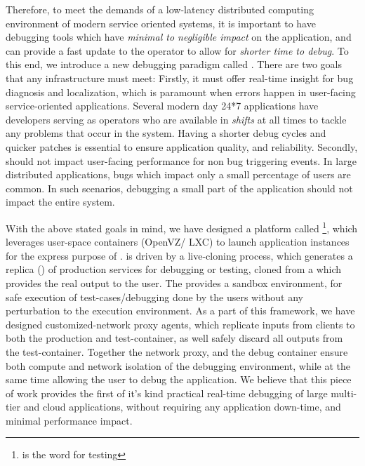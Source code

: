 Therefore, to meet the demands of a low-latency distributed computing environment of modern service oriented systems, it is important to have debugging tools which have \textit{minimal to negligible impact} on the application, and can provide a fast update to the operator to allow for \textit{shorter time to debug}.
To this end, we introduce a new debugging paradigm called \livedebugging.
There are two goals that any \livedebugging infrastructure must meet:
Firstly, it must offer real-time insight for bug diagnosis and localization, which is paramount when errors happen in user-facing service-oriented applications. 
Several modern day 24*7 applications have developers serving as operators who are available in \textit{shifts} at all times to tackle any problems that occur in the system.
Having a shorter debug cycles and quicker patches is essential to ensure application quality, and reliability.
Secondly, \livedebugging should not impact user-facing performance for non bug triggering events.
In large distributed applications, bugs which impact only a small percentage of users are common. 
In such scenarios, debugging a small part of the application should not impact the entire system.

With the above stated goals in mind, we have designed a platform called \parikshan\footnote{\parikshan is the \toolNameLang word for  testing}, which leverages user-space containers (OpenVZ/ LXC) to launch application instances for the express purpose of \livedebugging. 
\parikshan is driven by a  live-cloning process, which generates a replica (\debugcontainer) of production services for debugging or testing, cloned from a \productioncontainer which provides the real output to the user.
The \debugcontainer provides a sandbox environment, for safe execution of test-cases/debugging done by the users without any perturbation to the execution environment.
As a part of this framework, we have designed customized-network proxy agents, which replicate inputs from clients to both the production and test-container, as well safely discard all outputs from the test-container.
Together the network proxy, and the debug container ensure both compute and network isolation of the debugging environment, while at the same time allowing the user to debug the application.
We believe that this piece of work provides the first of it's kind practical real-time debugging of large multi-tier and cloud applications, without requiring any application down-time, and minimal performance impact.

